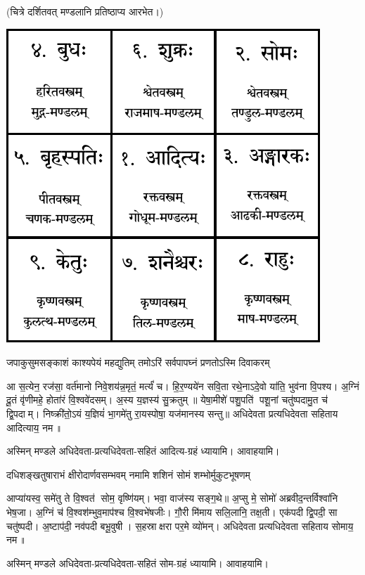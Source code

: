 
(चित्रे दर्शितवत् मण्डलानि प्रतिष्ठाप्य आरभेत।)

\includegraphics{purvanga/navagraha-diagram.pdf}

\twolineshloka
{जपाकुसुमसङ्काशं काश्यपेयं महद्युतिम्}
{तमोऽरिं सर्वपापघ्नं प्रणतोऽस्मि दिवाकरम्}

आ स॒त्येन॒ रज॑सा॒ वर्त॑मानो निवे॒शय॑न्न॒मृतं॒ मर्त्यं॑ च। हि॒र॒ण्यये॑न सवि॒ता रथे॒नाऽदे॒वो या॑ति॒
भुव॑ना वि॒पश्य\sn{}। अ॒ग्निं दू॒तं वृ॑णीमहे॒ होता॑रं वि॒श्ववे॑दसम्। अ॒स्य य॒ज्ञस्य॑ सु॒क्रतुम्॥
येषा॒मीशे॑ पशु॒पति॑ पशू॒नां चतु॑ष्पदामु॒त च॑ द्वि॒पदाम्। निष्क्री॑तो॒ऽयं य॒ज्ञियं॑ भा॒गमे॑तु
रा॒यस्पोषा॒ यज॑मानस्य सन्तु॥  अधिदेवता प्रत्यधिदेवता सहिताय आदित्याय॒ नम॥ 

अस्मिन् मण्डले अधिदेवता-प्रत्यधिदेवता-सहितं आदित्य-ग्रहं ध्यायामि। आवाहयामि।

\twolineshloka
{दधिशङ्खतुषाराभं क्षीरोदार्णवसम्भवम्}
{नमामि शशिनं सोमं शम्भोर्मुकुटभूषणम्}

आप्या॑यस्व॒ समे॑तु ते वि॒श्वत॑ सोम॒ वृष्णि॑यम्। भवा॒ वाज॑स्य सङ्ग॒थे॥ अ॒प्सु मे॒ सोमो॑
अब्रवीद॒न्तर्विश्वा॑नि भेष॒जा। अ॒ग्निं च॑ वि॒श्वश॑म्भुव॒माप॑श्च वि॒श्वभे॑षजीः। गौ॒री मि॑माय
सलि॒लानि॒ तक्ष॒ती। एक॑पदी द्वि॒पदी॒ सा चतु॑ष्पदी। अ॒ष्टाप॑दी॒ नव॑पदी बभू॒वुषी। स॒हस्राक्षरा पर॒मे
व्यो॑मन्।  अधिदेवता प्रत्यधिदेवता सहिताय सोमाय॒ नम॥ 

अस्मिन् मण्डले अधिदेवता-प्रत्यधिदेवता-सहितं सोम-ग्रहं ध्यायामि। आवाहयामि।


